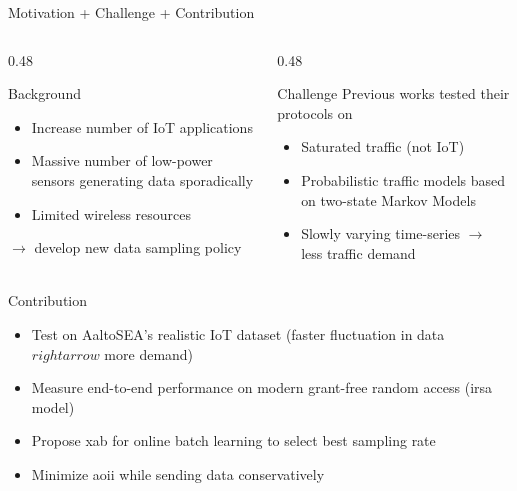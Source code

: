 \documentclass[9pt]{beamer}
\begin{document}
\begin{frame}{Motivation + Challenge + Contribution}
    \begin{columns}
        \begin{column}{0.48\textwidth}
            \begin{block}{Background}
                \begin{itemize}
                    \item \alert{Increase} number of IoT \alert{applications}
                    \item \alert{Massive} number of low-power \alert{sensors} generating data sporadically
                    \item \alert{Limited} wireless resources
                \end{itemize}
                $\rightarrow$ develop new \alert{data sampling policy}
            \end{block}
        \end{column}
        \begin{column}{0.48\textwidth}
            \begin{block}{Challenge}
                Previous works tested their protocols on
                \begin{itemize}
                    \item Saturated traffic (not IoT)
                    \item Probabilistic traffic models based on two-state Markov Models
                    \item Slowly varying time-series $\rightarrow$ less traffic demand
                \end{itemize}
            \end{block}
        \end{column}
    \end{columns}
    \begin{block}{Contribution}
        \begin{itemize}
            \item Test on AaltoSEA's \alert{realistic IoT dataset} (faster fluctuation in data $rightarrow$ more demand)
            \item Measure \alert{end-to-end performance} on modern grant-free random access (\gls{irsa} model)
            \item Propose \gls{xab} for \alert{online batch learning} to select best sampling rate
            \item Minimize \alert{\gls{aoii}} while sending data \alert{conservatively}
        \end{itemize}
    \end{block}
\end{frame}
\end{document}
